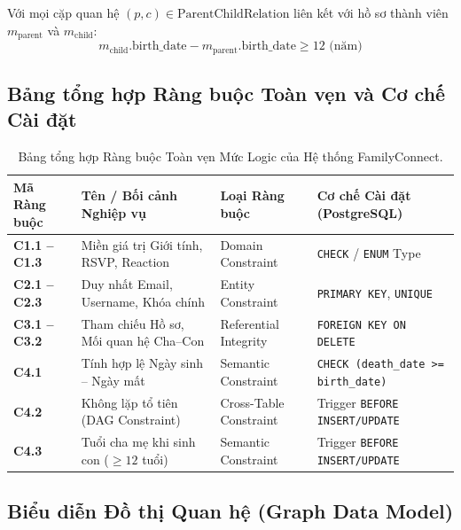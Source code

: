 \begin{definition}
Với mọi cặp quan hệ $(p, c) \in \text{ParentChildRelation}$ liên kết với hồ sơ thành viên $m_{\text{parent}}$ và $m_{\text{child}}$:
\[
m_{\text{child}}.\text{birth\_date} - m_{\text{parent}}.\text{birth\_date} \ge 12\text{ (năm)}
\]
\end{definition}

\subsection{Bảng tổng hợp Ràng buộc Toàn vẹn và Cơ chế Cài đặt}
\label{subsec:2_4_5_tong_hop}

\begin{table}[htbp]
\centering
\small
\caption{Bảng tổng hợp Ràng buộc Toàn vẹn Mức Logic của Hệ thống FamilyConnect.}
\label{tab:integrity_matrix}
\begin{tabularx}{\textwidth}{p{2.6cm} X p{3.2cm} Y}
\toprule
\textbf{Mã Ràng buộc} & \textbf{Tên / Bối cảnh Nghiệp vụ} & \textbf{Loại Ràng buộc} & \textbf{Cơ chế Cài đặt (PostgreSQL)} \\
\midrule
\textbf{C1.1 -- C1.3} & Miền giá trị Giới tính, RSVP, Reaction & Domain Constraint & \texttt{CHECK} / \texttt{ENUM} Type \\
\textbf{C2.1 -- C2.3} & Duy nhất Email, Username, Khóa chính & Entity Constraint & \texttt{PRIMARY KEY}, \texttt{UNIQUE} \\
\textbf{C3.1 -- C3.2} & Tham chiếu Hồ sơ, Mối quan hệ Cha--Con & Referential Integrity & \texttt{FOREIGN KEY ON DELETE} \\
\textbf{C4.1} & Tính hợp lệ Ngày sinh -- Ngày mất & Semantic Constraint & \texttt{CHECK (death\_date >= birth\_date)} \\
\textbf{C4.2} & Không lặp tổ tiên (DAG Constraint) & Cross-Table Constraint & Trigger \texttt{BEFORE INSERT/UPDATE} \\
\textbf{C4.3} & Tuổi cha mẹ khi sinh con ($\ge 12$ tuổi) & Semantic Constraint & Trigger \texttt{BEFORE INSERT/UPDATE} \\
\bottomrule
\end{tabularx}
\end{table}

\subsection{Biểu diễn Đồ thị Quan hệ (Graph Data Model)}
\label{subsec:2_4_6_graph}

